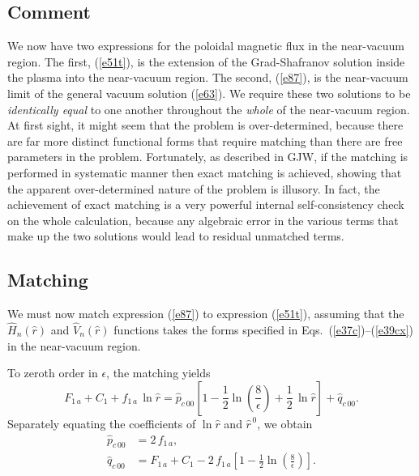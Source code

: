 \documentclass[12pt,prb,aps]{revtex4-1}
\begin{document}
\subsection{Comment}\label{sc}
We now have two expressions for the poloidal magnetic flux in the near-vacuum region. The first, (\ref{e51t}), is the extension of the Grad-Shafranov
solution inside the plasma into the near-vacuum region. The second, (\ref{e87}), is the near-vacuum limit of the general vacuum solution (\ref{e63}). 
We require these two solutions to be {\em identically equal}\/ to one another throughout the {\em whole}\/ of the near-vacuum region. At first sight, it might seem that
the problem is over-determined,\cite{goed} because there are far more distinct functional forms that require matching than there are free parameters in the problem. 
Fortunately, as described in GJW, if the matching is performed in systematic manner then exact matching is achieved, showing that the apparent over-determined nature of the problem is illusory. In fact, the achievement of exact matching is a very powerful internal self-consistency check on the 
whole calculation, because any algebraic error in the various terms that make up the two solutions would lead to residual unmatched terms. 

\subsection{Matching}\label{smatch}
We must now match expression (\ref{e87}) to expression (\ref{e51t}), assuming that the $\hat{H}_n(\hat{r})$ and
$\hat{V}_n(\hat{r})$ functions takes the forms specified in Eqs.~(\ref{e37c})--(\ref{e39cx}) in the near-vacuum region.

To zeroth order in $\epsilon$, the matching yields 
\begin{equation}
F_{1\,a}+C_1 + f_{1\,a}\,\ln\hat{r} =\hat{p}_{c\,00} \left[1-\frac{1}{2}\ln\left(\frac{8}{\epsilon}\right)+\frac{1}{2}\,\ln\hat{r}\right]+\hat{q}_{c\,00}.
\end{equation}
Separately equating the coefficients of $\ln\hat{r}$ and $\hat{r}^{\,0}$, we obtain\,\cite{greene}
\begin{align}
\hat{p}_{c\,00} &= 2\,f_{1\,a},\\[0.5ex]
\hat{q}_{c\,00} &= F_{1\,a}+C_1 -2\,f_{1\,a}\left[1-\frac{1}{2}\ln\left(\frac{8}{\epsilon}\right)\right].\label{e97e}
\end{align}
\end{document}
